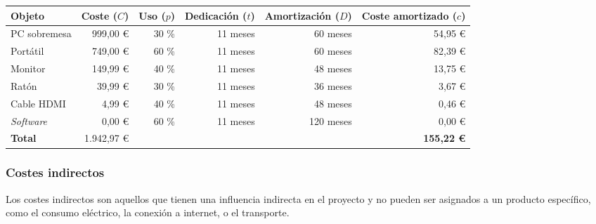\begin{table}[htb]
    {
      \begin{adjustbox}{max width=\textwidth}
        \begin{tabular}{lrrrrr}
          \toprule
          \textbf{Objeto}   & \textbf{Coste ($C$)} & \textbf{Uso ($p$)} & \textbf{Dedicación ($t$)} & \textbf{Amortización ($D$)} & \textbf{Coste amortizado ($c$)} \\
          \midrule
          PC sobremesa      &  999,00 \euro        & 30 \%              & 11 meses                  &  60 meses                   &  54,95 \euro \\
          Portátil          &  749,00 \euro        & 60 \%              & 11 meses                  &  60 meses                   &  82,39 \euro \\
          Monitor           &  149,99 \euro        & 40 \%              & 11 meses                  &  48 meses                   &  13,75 \euro \\
          Ratón             &   39,99 \euro        & 30 \%              & 11 meses                  &  36 meses                   &   3,67 \euro \\
          Cable HDMI        &    4,99 \euro        & 40 \%              & 11 meses                  &  48 meses                   &   0,46 \euro \\
          \textit{Software} &    0,00 \euro        & 60 \%              & 11 meses                  & 120 meses                   &   0,00 \euro \\
          \midrule
          \textbf{Total}    & 1.942,97 \euro       &                    &                           &                             & \textbf{155,22 \euro} \\
          \bottomrule
        \end{tabular}
      \end{adjustbox}
    }
\end{table}

\subsubsection{Costes indirectos}

Los costes indirectos son aquellos que tienen una influencia indirecta en el
proyecto y no pueden ser asignados a un producto específico, como el consumo
eléctrico, la conexión a internet, o el transporte.

